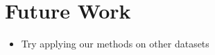 \section{Future Work} \label{sec:future_work}


\begin{itemize}

    \item Try applying our methods on other datasets

\end{itemize}

